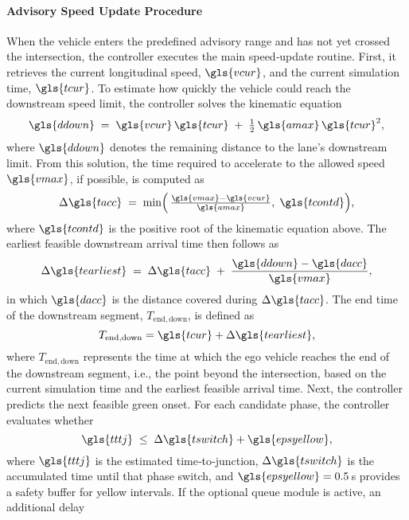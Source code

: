 \paragraph{Advisory Speed Update Procedure} 
When the vehicle enters the predefined advisory range and has not yet crossed the intersection, the controller executes the main speed‐update routine. First, it retrieves the current longitudinal speed, $\gls{vcur}$, and the current simulation time, $\gls{tcur}$. To estimate how quickly the vehicle could reach the downstream speed limit, the controller solves the kinematic equation
\begin{equation}
   \gls{ddown} \;=\; \gls{vcur}\,\gls{tcur} \;+\; \tfrac{1}{2}\,\gls{amax}\,\gls{tcur}^2, 
\end{equation}
where $\gls{ddown}$ denotes the remaining distance to the lane’s downstream limit. From this solution, the time required to accelerate to the allowed speed $\gls{vmax}$, if possible, is computed as
\begin{equation}
    \Delta \gls{tacc} 
    \;=\; 
    \min\Bigl(\,\tfrac{\gls{vmax} - \gls{vcur}}{\gls{amax}},\; 
    \gls{tcontd}\Bigr),
\end{equation}
where $\gls{tcontd}$ is the positive root of the kinematic equation above. The earliest feasible downstream arrival time then follows as
\begin{equation}
    \Delta \gls{tearliest} 
    \;=\; 
    \Delta \gls{tacc} \;+\; 
    \frac{\gls{ddown} - \gls{dacc}}{\,\gls{vmax}\,},
\end{equation}
in which $\gls{dacc}$ is the distance covered during $\Delta \gls{tacc}$. The end time of the downstream segment, $T_{\mathrm{end,down}}$, is defined as
\begin{equation}
    T_{\mathrm{end,down}} = \gls{tcur} + \Delta \gls{tearliest},
\end{equation}
where $T_{\mathrm{end,down}}$ represents the time at which the ego vehicle reaches the end of the downstream segment, i.e., the point beyond the intersection, based on the current simulation time and the earliest feasible arrival time.
\mynewline
Next, the controller predicts the next feasible green onset. For each candidate phase, the controller evaluates whether
\begin{equation}
    \gls{tttj} \;\le\; \Delta \gls{tswitch} + \gls{epsyellow},
\end{equation}
where $\gls{tttj}$ is the estimated time‐to‐junction, $\Delta \gls{tswitch}$ is the accumulated time until that phase switch, and $\gls{epsyellow}=0.5\,$s provides a safety buffer for yellow intervals. If the optional queue module is active, an additional delay
